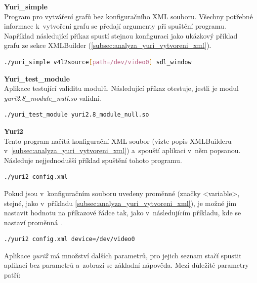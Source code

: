 \documentclass[thesis=M,czech]{FITthesis}[2012/06/26]
\begin{document}
\begin{description}
  \item \textbf{Yuri\_simple\\}
  Program pro vytváření grafů bez konfiguračního XML souboru. Všechny potřebné informace k~vytvoření grafu se předají argumenty při spuštění programu. Například následující příkaz spustí stejnou konfiguraci jako ukázkový příklad grafu ze sekce XMLBuilder (\ref{subsec:analyza_yuri_vytvoreni_xml}).\\

\begin{lstlisting}[language=bash,identifierstyle=\color{black}]
./yuri_simple v4l2source[path=/dev/video0] sdl_window
\end{lstlisting}

  \item \textbf{Yuri\_test\_module\\}
  Aplikace testující validitu modulů. Následující příkaz otestuje, jestli je modul \textit{yuri2.8\_module\_null.so} validní.\\

\begin{lstlisting}[language=bash,identifierstyle=\color{black}]
./yuri_test_module yuri2.8_module_null.so
\end{lstlisting}

  \item \textbf{Yuri2\\}
Tento program načítá konfigurační XML soubor (vizte popis XMLBuilderu v~\ref{subsec:analyza_yuri_vytvoreni_xml}) a~spouští aplikaci v~něm popsanou. Následuje nejjednodušší příklad spuštění tohoto programu.\\

\begin{lstlisting}[language=bash,identifierstyle=\color{black}]
./yuri2 config.xml
\end{lstlisting}

Pokud jsou v~konfiguračním souboru uvedeny proměnné (značky <variable>, stejné, jako v~příkladu \ref{subsec:analyza_yuri_vytvoreni_xml}), je možné jim nastavit hodnotu na příkazové řádce tak, jako v~následujícím příkladu, kde se nastaví proměnná .\\

\begin{lstlisting}[language=bash,identifierstyle=\color{black}]
./yuri2 config.xml device=/dev/video0
\end{lstlisting}

Aplikace \textit{yuri2} má množství dalších parametrů, pro jejich seznam stačí spustit aplikaci bez parametrů a~zobrazí se základní nápověda. Mezi důležité parametry patří:


\end{description}
\end{document}
